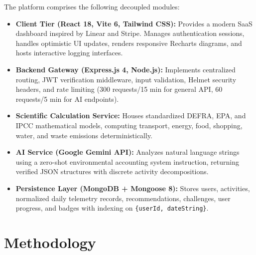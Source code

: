 \documentclass[12pt,a4paper]{article}
\begin{document}
The platform comprises the following decoupled modules:
\begin{itemize}
    \item \textbf{Client Tier (React 18, Vite 6, Tailwind CSS):} Provides a modern SaaS dashboard inspired by Linear and Stripe. Manages authentication sessions, handles optimistic UI updates, renders responsive Recharts diagrams, and hosts interactive logging interfaces.
    \item \textbf{Backend Gateway (Express.js 4, Node.js):} Implements centralized routing, JWT verification middleware, input validation, Helmet security headers, and rate limiting (300 requests/15 min for general API, 60 requests/5 min for AI endpoints).
    \item \textbf{Scientific Calculation Service:} Houses standardized DEFRA, EPA, and IPCC mathematical models, computing transport, energy, food, shopping, water, and waste emissions deterministically.
    \item \textbf{AI Service (Google Gemini API):} Analyzes natural language strings using a zero-shot environmental accounting system instruction, returning verified JSON structures with discrete activity decompositions.
    \item \textbf{Persistence Layer (MongoDB + Mongoose 8):} Stores users, activities, normalized daily telemetry records, recommendations, challenges, user progress, and badges with indexing on \texttt{\{userId, dateString\}}.
\end{itemize}

\section{Methodology}
\end{document}
